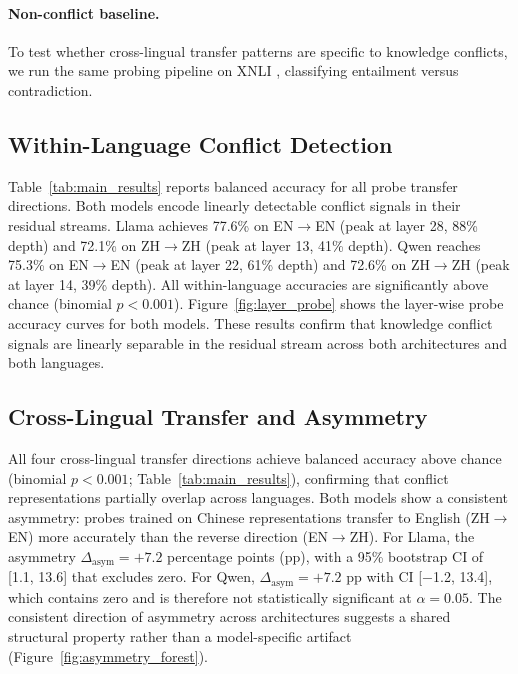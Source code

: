 \paragraph{Non-conflict baseline.}
To test whether cross-lingual transfer patterns are specific to knowledge conflicts, we run the same probing pipeline on XNLI \citep{conneau2018xnli}, classifying entailment versus contradiction.

\subsection{Within-Language Conflict Detection}
\label{sec:within_lang}

Table~\ref{tab:main_results} reports balanced accuracy for all probe transfer directions.
Both models encode linearly detectable conflict signals in their residual streams.
Llama achieves 77.6\% on EN$\to$EN (peak at layer 28, 88\% depth) and 72.1\% on ZH$\to$ZH (peak at layer 13, 41\% depth).
Qwen reaches 75.3\% on EN$\to$EN (peak at layer 22, 61\% depth) and 72.6\% on ZH$\to$ZH (peak at layer 14, 39\% depth).
All within-language accuracies are significantly above chance (binomial $p < 0.001$).
Figure~\ref{fig:layer_probe} shows the layer-wise probe accuracy curves for both models.
These results confirm that knowledge conflict signals are linearly separable in the residual stream across both architectures and both languages.

\subsection{Cross-Lingual Transfer and Asymmetry}
\label{sec:cross_lingual}

All four cross-lingual transfer directions achieve balanced accuracy above chance (binomial $p < 0.001$; Table~\ref{tab:main_results}), confirming that conflict representations partially overlap across languages.
Both models show a consistent asymmetry: probes trained on Chinese representations transfer to English (ZH$\to$EN) more accurately than the reverse direction (EN$\to$ZH).
For Llama, the asymmetry $\Delta_{\text{asym}} = +7.2$ percentage points (pp), with a 95\% bootstrap CI of [1.1, 13.6] that excludes zero.
For Qwen, $\Delta_{\text{asym}} = +7.2$ pp with CI [$-$1.2, 13.4], which contains zero and is therefore not statistically significant at $\alpha = 0.05$.
The consistent direction of asymmetry across architectures suggests a shared structural property rather than a model-specific artifact (Figure~\ref{fig:asymmetry_forest}).

